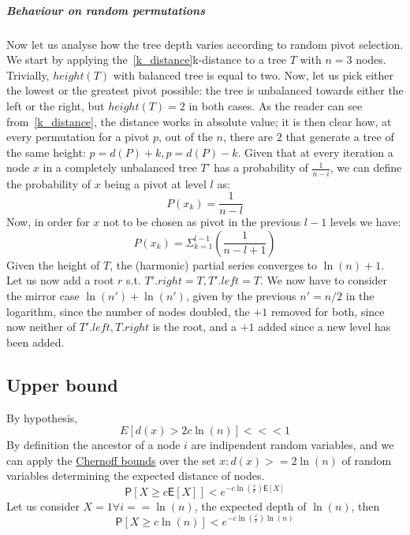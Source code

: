 \documentclass{article}
\newcommand*{\expect}{\mathsf{E}}   %
\newcommand*{\prob}{\mathsf{P}}     %
\begin{document}
\subparagraph{Behaviour on random permutations}
Now let us analyse how the tree depth varies according to random pivot selection.
We start by applying the~\ref{k_distance}k-distance to a tree $T$ with $n = 3$
nodes.
Trivially, $height(T)$ with balanced tree is equal to two.
Now, let us pick either the lowest or the greatest pivot possible: the tree
is unbalanced towards either the left or the right, but $height(T) = 2$ in
both cases.
As the reader can see from~\ref{k_distance}, the distance works in absolute
value; it is then clear how, at every permutation for a pivot $p$, out of the
$n$, there are $2$ that generate a tree of the same height:
$p = d(P) + k, p = d(P) - k$.
Given that at every iteration a node $x$ in a completely unbalanced tree $T$'
has a probability of $\frac{1}{n - i}$, we can define the probability of $x$
being a pivot at level $l$ as:
    \begin{equation}
    P(x_{k}) = \frac{1}{n - l}
    \end{equation}
Now, in order for $x$ not to be chosen as pivot in the previous $l - 1$
levels we have:
    \begin{equation}
    P(x_{k}) = \Sigma_{k = 1}^{l - 1} (\frac{1}{n - l + 1})
    \end{equation}
Given the height of $T$, the (harmonic) partial series converges to
$\ln{(n)} + 1$.
Let us now add a root $r$ s.t. $T'.right = T, T'.left = T$.
We now have to consider the mirror case $\ln{(n')} + \ln{(n')}$,
given by the previous $n' = n/2$ in the logarithm, since the number of nodes
doubled, the $+1$ removed for both, since now neither of $T'.left, T.right$
is the root, and a $+1$ added since a new level has been added.

\subsection{Upper bound}

By hypothesis,
    \begin{equation}
    E[d(x) > 2 c \ln(n)] <<< 1
    \end{equation}
By definition the ancestor of a node $i$ are indipendent random variables,
and we can apply the \href{https://en.wikipedia.org/wiki/Chernoff_bound}{Chernoff
bounds} over the set ${x: d(x) >= 2 \ln(n)}$ of random variables determining
the expected distance of nodes.
\begin{equation*}
    \prob[X \geq c \expect[X]] < e^{-c \ln(\frac{c}{e})\expect[X]}
\end{equation*}
Let us consider $X = 1 \forall i == \ln(n)$, the expected depth of $\ln(n)$,
then
\begin{equation*}
    \prob[X \geq c \ln(n)] < e^{-c \ln(\frac{c}{e})\ln(n)}
\end{equation*}
\end{document}

